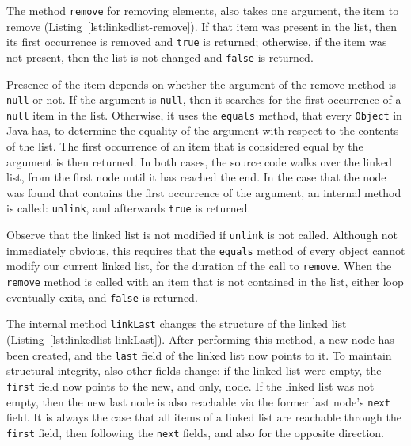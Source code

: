 \documentclass[runningheads]{llncs}
\begin{document}


The method \texttt{remove} for removing elements, also takes one argument, the item to remove (Listing~\ref{lst:linkedlist-remove}). If that item was present in the list, then its first occurrence is removed and \texttt{true} is returned; otherwise, if the item was not present, then the list is not changed and \texttt{false} is returned.

Presence of the item depends on whether the argument of the remove method is \texttt{null} or not. If the argument is \texttt{null}, then it searches for the first occurrence of a \texttt{null} item in the list. Otherwise, it uses the \texttt{equals} method, that every \texttt{Object} in Java has, to determine the equality of the argument with respect to the contents of the list. The first occurrence of an item that is considered equal by the argument is then returned. In both cases, the source code walks over the linked list, from the first node until it has reached the end. In the case that the node was found that contains the first occurrence of the argument, an internal method is called: \texttt{unlink}, and afterwards \texttt{true} is returned.

Observe that the linked list is not modified if \texttt{unlink} is not called. Although not immediately obvious, this requires that the \texttt{equals} method of every object cannot modify our current linked list, for the duration of the call to \texttt{remove}. When the \texttt{remove} method is called with an item that is not contained in the list, either loop eventually exits, and \texttt{false} is returned.



The internal method \texttt{linkLast} changes the structure of the linked list (Listing~\ref{lst:linkedlist-linkLast}). After performing this method, a new node has been created, and the \texttt{last} field of the linked list now points to it. To maintain structural integrity, also other fields change: if the linked list were empty, the \texttt{first} field now points to the new, and only, node. If the linked list was not empty, then the new last node is also reachable via the former last node's \texttt{next} field. It is always the case that all items of a linked list are reachable through the \texttt{first} field, then following the \texttt{next} fields, and also for the opposite direction.
\end{document}
